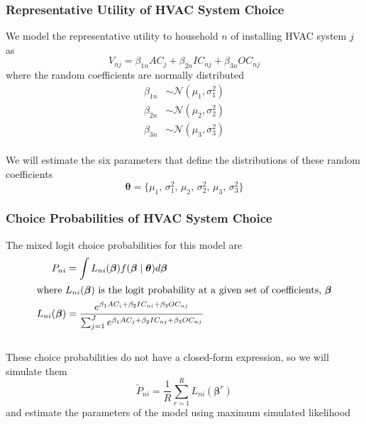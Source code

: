 \documentclass{beamer}
\begin{document}
\begin{frame}\frametitle{Representative Utility of HVAC System Choice}
	We model the representative utility to household $n$ of installing HVAC system $j$ as
	$$V_{nj} = \beta_{1n} AC_j + \beta_{2n} IC_{nj} + \beta_{3n} OC_{nj}$$
	where the random coefficients are normally distributed
	\begin{align*}
		\beta_{1n} & \sim \mathcal{N}(\mu_1, \sigma_1^2) \\
		\beta_{2n} & \sim \mathcal{N}(\mu_2, \sigma_2^2) \\
		\beta_{3n} & \sim \mathcal{N}(\mu_3, \sigma_3^2)
	\end{align*} \\
	\vspace{3ex}
	We will estimate the six parameters that define the distributions of these random coefficients
	$$\bm{\theta} = \{ \text{$\mu_1$, $\sigma_1^2$, $\mu_2$, $\sigma_2^2$, $\mu_3$, $\sigma_3^2$} \}$$
\end{frame}

\begin{frame}\frametitle{Choice Probabilities of HVAC System Choice}
	The mixed logit choice probabilities for this model are
    \begin{align*}
        P_{ni} & = \int L_{ni}(\bm{\beta}) f(\bm{\beta} \mid \bm{\theta}) d \bm{\beta} \\
        \intertext{where $L_{ni}(\bm{\beta})$ is the logit probability at a given set of coefficients, $\bm{\beta}$}
        L_{ni}(\bm{\beta}) & = \frac{e^{\beta_1 AC_i + \beta_2 IC_{ni} + \beta_3 OC_{nj}}}{\sum_{j = 1}^J e^{\beta_1 AC_j + \beta_2 IC_{nj} + \beta_3 OC_{nj}}}
    \end{align*} \\
    \vspace{3ex}
    These choice probabilities do not have a closed-form expression, so we will simulate them
    $$\check{P}_{ni} = \frac{1}{R} \sum_{r = 1}^R L_{ni}(\bm{\beta}^r)$$
    and estimate the parameters of the model using maximum simulated likelihood
\end{frame}
\end{document}
